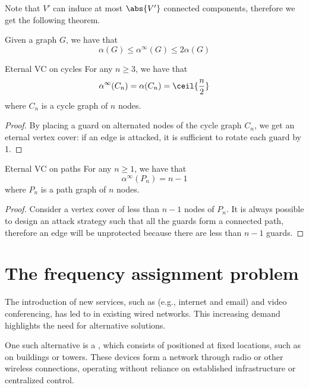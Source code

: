 \documentclass[a4paper, 12pt]{report}
\begin{document}
    Note that $V'$ can induce at most $\abs{V'}$ connected components, therefore we get the following theorem.

    \begin{framedthm}{}
        Given a graph $G$, we have that $$\alpha(G) \le \alpha^{\infty} (G) \le 2 \alpha(G)$$
    \end{framedthm}

    \begin{framedthm}{Eternal VC on cycles}
        For any $n \ge 3$, we have that $$\alpha^{\infty}(C_n) = \alpha(C_n) = \ceil{\frac{n}{2}}$$ where $C_n$ is a cycle graph of $n$ nodes.
    \end{framedthm}

    \begin{proof}
        By placing a guard on alternated nodes of the cycle graph $C_n$, we get an eternal vertex cover: if an edge is attacked, it is sufficient to rotate each guard by 1.
    \end{proof}

    \begin{framedthm}{Eternal VC on paths}
        For any $n \ge 1$, we have that $$\alpha^{\infty}(P_n) = n - 1$$ where $P_n$ is a path graph of $n$ nodes.
    \end{framedthm}
    
    \begin{proof}
        Consider a vertex cover of less than $n - 1$ nodes of $P_n$. It is always possible to design an attack strategy such that all the guards form a connected path, therefore an edge will be unprotected because there are less than $n - 1$ guards.
    \end{proof}

    \chapter{The frequency assignment problem}

    The introduction of new services, such as  (e.g., internet and email) and video conferencing, has led to  in existing wired networks. This increasing demand highlights the need for alternative solutions.

    One such alternative is a , which consists of  positioned at fixed locations, such as on buildings or towers. These devices form a network through radio or other wireless connections, operating without reliance on established infrastructure or centralized control.
\end{document}
